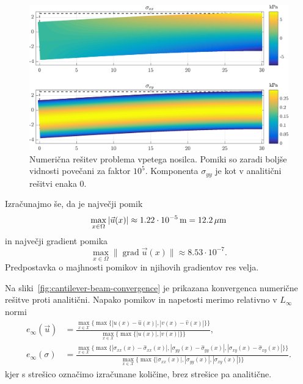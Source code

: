 \documentclass[12pt,a4paper,twoside]{article}
\theoremstyle{definition} %
\theoremstyle{plain} %
\numberwithin{equation}{section}
\newcommand{\X}{\mathcal{X}}
\newcommand{\grad}{\operatorname{grad}}
\newcommand{\vu}{\vec{u}}
\newcommand{\ts}{\sigma}
\newlength{\iw}
\begin{document}
\begin{figure}[h]
  \centering
  \includegraphics[width=\iw]{images/cantilever_beam_solution.png}
  \caption[Numerična rešitev problema vpetega nosilca.]{Numerična rešitev
  problema vpetega nosilca. Pomiki so zaradi boljše vidnosti povečani za faktor
  $10^5$. Komponenta $\ts_{yy}$ je kot v analitični rešitvi enaka 0.}
  \label{fig:cantilever-beam-solution}
\end{figure}
Izračunajmo še, da je največji pomik
\begin{equation}
  \max_{x \in \Omega} |\vu(x)| \approx \unit[1.22 \cdot 10^{-5}]{m} = \unit[12.2]{\mu m}
\end{equation}
in največji gradient pomika
\begin{equation}
  \max_{x \in \Omega} \|\grad \vu(x)\| \approx 8.53 \cdot 10^{-7}.
\end{equation}
Predpostavka o majhnosti pomikov in njihovih gradientov res velja.

Na sliki~\ref{fig:cantilever-beam-convergence} je prikazana konvergenca numerične rešitve proti
analitični. Napako pomikov in napetosti merimo relativno v $L_\infty$ normi
\begin{align}
  e_\infty(\vu) &= \frac{\max_{x\in \X} \{\max\{|u(x)-\hat u(x)|, |v(x)-\hat v(x)|\}\}}
  {\max_{x\in \X} \{\max\{|u(x)|, |v(x)|\}\}}, \\
  e_\infty(\ts) &= \frac{\max_{x\in \X} \{\max\{|\sigma_{xx}(x)-\hat{\sigma}_{xx}(x)|,
  |\sigma_{yy}(x)-\hat{\sigma}_{yy}(x)|,
  |\sigma_{xy}(x)-\hat{\sigma}_{xy}(x)| \}\}}{
  \max_{x\in \X} \{\max\{|\sigma_{xx}(x)|, |\sigma_{yy}(x)|, |\sigma_{xy}(x)| \}\}}.
\end{align}
kjer s strešico označimo izračunane količine, brez strešice pa analitične.
\end{document}
